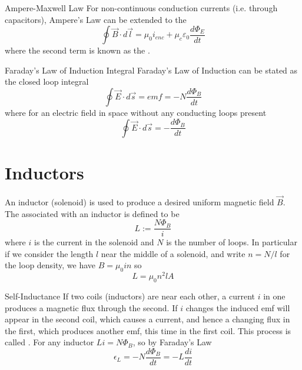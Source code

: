 \documentclass[12pt]{report}
\begin{document}
\begin{defn}{Ampere-Maxwell Law}{}
        For non-continuous conduction currents (i.e. through capacitors), Ampere's Law can be extended to the  \begin{equation}
                \oint\limits \vec{B}\cdot d\vec{l} = \mu_0 i_{enc} + \mu_c\varepsilon_0\frac{d\Phi_E}{dt}
        \end{equation}
        where the second term is known as the .
\end{defn}


\begin{defn}{Faraday's Law of Induction Integral}{}
        Faraday's Law of Induction can be stated as the closed loop integral \begin{equation}
                \oint\limits\vec{E}\cdot d\vec{s} = emf = -N\frac{d\Phi_B}{dt}
        \end{equation}
        where for an electric field in space without any conducting loops present \begin{equation}
                \oint\limits \vec{E}\cdot d\vec{s} = -\frac{d\Phi_B}{dt}
        \end{equation}
\end{defn}


\section{Inductors}

\begin{defn}{}{}
        An inductor (solenoid) is used to produce a desired uniform magnetic field $\vec{B}$. The  associated with an inductor is defined to be \begin{equation}
                L := \frac{N\Phi_B}{i}
        \end{equation}
        where $i$ is the current in the solenoid and $N$ is the number of loops. In particular if we consider the length $l$ near the middle of a solenoid, and write $n = N/l$ for the loop density, we have $B = \mu_0in$ so \begin{equation}
                L = \mu_0n^2lA
        \end{equation}
\end{defn}

\begin{thm}{Self-Inductance}{}
        If two coils (inductors) are near each other, a current $i$ in one produces a magnetic flux through the second. If $i$ changes the induced emf will appear in the second coil, which causes a current, and hence a changing flux in the first, which produces another emf, this time in the first coil. This process is called . For any inductor $Li  = N\Phi_B$, so by Faraday's Law \begin{equation}
                \epsilon_L = -N\frac{d\Phi_B}{dt} = -L\frac{di}{dt}
        \end{equation}
\end{thm}
\end{document}
